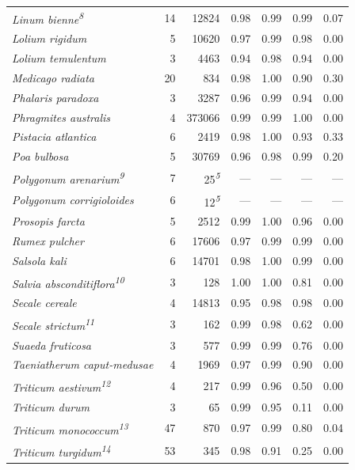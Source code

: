 \documentclass[
  authoryear,
  preprint]{elsarticle}
\begin{document}
\begin{longtable}{@{\extracolsep{\fill}}lrrrrrr}
{\itshape Linum bienne}\textsuperscript{\textit{8}} & 14 & 12824 & 0.98 & 0.99 & 0.99 & 0.07 \\ 
{\itshape Lolium rigidum} & 5 & 10620 & 0.97 & 0.99 & 0.98 & 0.00 \\ 
{\itshape Lolium temulentum} & 3 & 4463 & 0.94 & 0.98 & 0.94 & 0.00 \\ 
{\itshape Medicago radiata} & 20 & 834 & 0.98 & 1.00 & 0.90 & 0.30 \\ 
{\itshape Phalaris paradoxa} & 3 & 3287 & 0.96 & 0.99 & 0.94 & 0.00 \\ 
{\itshape Phragmites australis} & 4 & 373066 & 0.99 & 0.99 & 1.00 & 0.00 \\ 
{\itshape Pistacia atlantica} & 6 & 2419 & 0.98 & 1.00 & 0.93 & 0.33 \\ 
{\itshape Poa bulbosa} & 5 & 30769 & 0.96 & 0.98 & 0.99 & 0.20 \\ 
{\itshape Polygonum arenarium}\textsuperscript{\textit{9}} & 7 & 25\textsuperscript{\textit{5}} & — & — & — & — \\ 
{\itshape Polygonum corrigioloides} & 6 & 12\textsuperscript{\textit{5}} & — & — & — & — \\ 
{\itshape Prosopis farcta} & 5 & 2512 & 0.99 & 1.00 & 0.96 & 0.00 \\ 
{\itshape Rumex pulcher} & 6 & 17606 & 0.97 & 0.99 & 0.99 & 0.00 \\ 
{\itshape Salsola kali} & 6 & 14701 & 0.98 & 1.00 & 0.99 & 0.00 \\ 
{\itshape Salvia absconditiflora}\textsuperscript{\textit{10}} & 3 & 128 & 1.00 & 1.00 & 0.81 & 0.00 \\ 
{\itshape Secale cereale} & 4 & 14813 & 0.95 & 0.98 & 0.98 & 0.00 \\ 
{\itshape Secale strictum}\textsuperscript{\textit{11}} & 3 & 162 & 0.99 & 0.98 & 0.62 & 0.00 \\ 
{\itshape Suaeda fruticosa} & 3 & 577 & 0.99 & 0.99 & 0.76 & 0.00 \\ 
{\itshape Taeniatherum caput-medusae} & 4 & 1969 & 0.97 & 0.99 & 0.90 & 0.00 \\ 
{\itshape Triticum aestivum}\textsuperscript{\textit{12}} & 4 & 217 & 0.99 & 0.96 & 0.50 & 0.00 \\ 
{\itshape Triticum durum} & 3 & 65 & 0.99 & 0.95 & 0.11 & 0.00 \\ 
{\itshape Triticum monococcum}\textsuperscript{\textit{13}} & 47 & 870 & 0.97 & 0.99 & 0.80 & 0.04 \\ 
{\itshape Triticum turgidum}\textsuperscript{\textit{14}} & 53 & 345 & 0.98 & 0.91 & 0.25 & 0.00 \\ 

\end{longtable}
\end{document}
